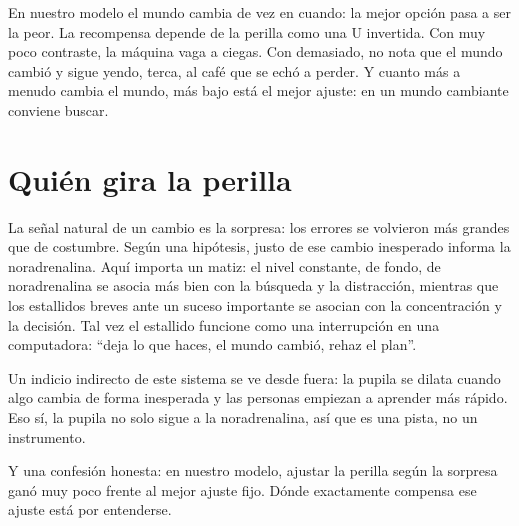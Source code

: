 En nuestro modelo el mundo cambia de vez en cuando: la mejor opción pasa a ser la peor. La recompensa depende de la perilla como una U invertida. Con muy poco contraste, la máquina vaga a ciegas. Con demasiado, no nota que el mundo cambió y sigue yendo, terca, al café que se echó a perder. Y cuanto más a menudo cambia el mundo, más bajo está el mejor ajuste: en un mundo cambiante conviene buscar.


\section*{Quién gira la perilla}

La señal natural de un cambio es la sorpresa: los errores se volvieron más grandes que de costumbre. Según una hipótesis, justo de ese cambio inesperado informa la noradrenalina. Aquí importa un matiz: el nivel constante, de fondo, de noradrenalina se asocia más bien con la búsqueda y la distracción, mientras que los estallidos breves ante un suceso importante se asocian con la concentración y la decisión. Tal vez el estallido funcione como una interrupción en una computadora: “deja lo que haces, el mundo cambió, rehaz el plan”.

Un indicio indirecto de este sistema se ve desde fuera: la pupila se dilata cuando algo cambia de forma inesperada y las personas empiezan a aprender más rápido. Eso sí, la pupila no solo sigue a la noradrenalina, así que es una pista, no un instrumento.

Y una confesión honesta: en nuestro modelo, ajustar la perilla según la sorpresa ganó muy poco frente al mejor ajuste fijo. Dónde exactamente compensa ese ajuste está por entenderse.

